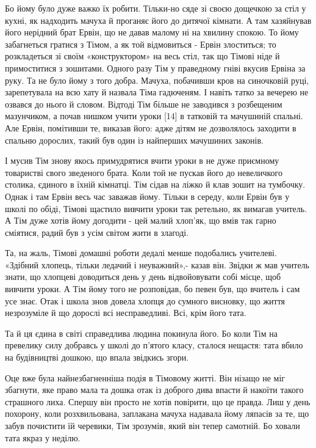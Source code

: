 Бо йому було дуже важко їх робити. Тільки-но сяде зі своєю дощечкою за стіл у
кухні, як надходить мачуха й проганяє його до дитячої кімнати. А там хазяйнував
його нерідний брат Ервін, що не давав малому ні на хвилину спокою. То йому
забагнеться гратися з Тімом, а як той відмовиться - Ервін злоститься; то
розкладеться зі своїм «конструктором» на весь стіл, так що Тімові ніде й
примоститися з зошитами. Одного разу Тім у праведному гніві вкусив Ервіна за
руку. Та не було йому з того добра. Мачуха, побачивши кров на синочковій руці,
зарепетувала на всю хату й назвала Тіма гадюченям. І навіть татко за вечерею не
озвався до нього й словом. Відтоді Тім більше не заводився з розбещеним
мазунчиком, а почав нишком учити уроки [14] в татковій та мачушиній спальні.
Але Ервін, помітивши те, виказав його: адже дітям не дозволялось заходити в
спальню дорослих, такий був один із найперших мачушиних законів.

І мусив Тім знову якось примудрятися вчити уроки в не дуже приємному товаристві
свого зведеного брата. Коли той не пускав його до невеличкого столика, єдиного
в їхній кімнатці. Тім сідав на ліжко й клав зошит на тумбочку. Однак і там
Ервін весь час заважав йому. Тільки в середу, коли Ервін був у школі по обіді,
Тімові щастило вивчити уроки так ретельно, як вимагав учитель. А Тім дуже хотів
йому догодити - цей малий хлоп'як, що вмів так гарно сміятися, радий був з усім
світом жити в злагоді.

Та, на жаль, Тімові домашні роботи дедалі менше подобались учителеві. «Здібний
хлопець, тільки ледачий і неуважний»,- казав він. Звідки ж мав учитель знати,
що хлопцеві доводиться день у день відвойовувати собі місце, щоб вивчити уроки.
А Тім йому того не розповідав, бо певен був, що вчитель і сам усе знає. Отак і
школа знов довела хлопця до сумного висновку, що життя незрозуміле й що дорослі
всі несправедливі. Всі, крім його тата.

Та й ця єдина в світі справедлива людина покинула його. Бо коли Тім на
превелику силу добравсь у школі до п'ятого класу, сталося нещастя: тата вбило
на будівництві дошкою, що впала звідкись згори.

Оце вже була найнезбагненніша подія в Тімовому житті. Він нізащо не міг
збагнути, яке право мала та дошка отак із доброго дива впасти й накоїти такого
страшного лиха. Спершу він просто не хотів повірити, що це правда. Лиш у день
похорону, коли розхвильована, заплакана мачуха надавала йому ляпасів за те, що
забув почистити їй черевики, Тім зрозумів, який він тепер самотній. Бо ховали
тата якраз у неділю.


